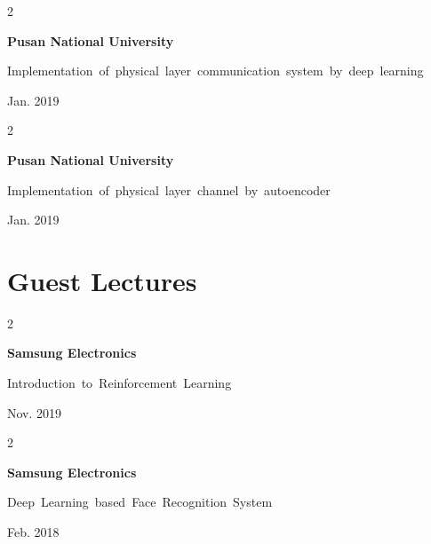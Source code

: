 \documentclass[10pt, letterpaper]{article}
\newenvironment{twocolentry}[2][]{
    \onecolentry
    \def\secondColumn{#2}
    \setcolumnwidth{\fill, 4.5 cm}
    \begin{paracol}{2}
}{
    \switchcolumn \raggedleft \secondColumn
    \end{paracol}
    \endonecolentry
} %
\begin{document}
            \begin{samepage}
            \begin{twocolentry}{
                Jan. 2019
            }
                \textbf{Pusan National University}

                \vspace{0.10 cm}

                \mbox{Implementation of physical layer communication system by deep learning}
                \vspace{0.10 cm}
            \end{twocolentry}
        \end{samepage}
                \begin{samepage}
            \begin{twocolentry}{
                Jan. 2019
            }
                \textbf{Pusan National University}

                \vspace{0.10 cm}

                \mbox{Implementation of physical layer channel by autoencoder}
                \vspace{0.10 cm}
            \end{twocolentry}
        \end{samepage}


    \section{Guest Lectures}

        
        \begin{samepage}
            \begin{twocolentry}{
                Nov. 2019
            }
                \textbf{Samsung Electronics}

                \vspace{0.10 cm}

                \mbox{Introduction to Reinforcement Learning}
                \vspace{0.10 cm}
            \end{twocolentry}
        \end{samepage}

        \begin{samepage}
            \begin{twocolentry}{
                Feb. 2018
            }
                \textbf{Samsung Electronics}

                \vspace{0.10 cm}

                \mbox{Deep Learning based Face Recognition System}
                \vspace{0.10 cm}
            \end{twocolentry}
        \end{samepage}
\end{document}
